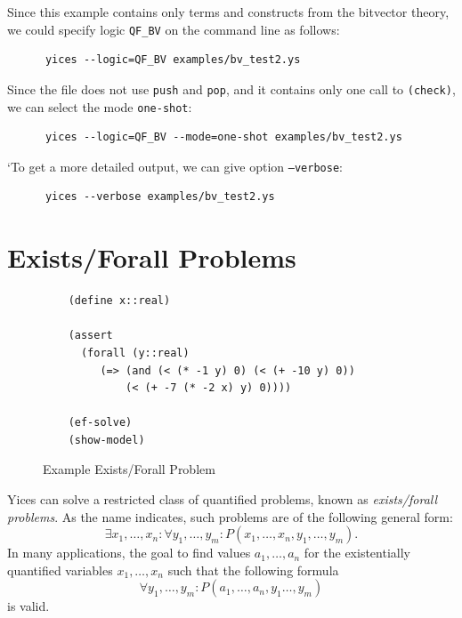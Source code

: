 \documentclass[11pt,twoside,fleqn,openright,titlepage]{cslreport}
\begin{document}
\medskip\noindent
Since  this  example  contains  only  terms and  constructs  from  the
bitvector  theory,  we  could  specify logic  \texttt{QF\_BV}  on  the
command line as follows:
\begin{small}
\begin{verbatim}
      yices --logic=QF_BV examples/bv_test2.ys
\end{verbatim}
\end{small}
Since the file does not use \texttt{push} and \texttt{pop}, and it
contains only one call to \texttt{(check)}, we can select the mode
\texttt{one-shot}:
\begin{small}
\begin{verbatim}
      yices --logic=QF_BV --mode=one-shot examples/bv_test2.ys
\end{verbatim}
\end{small}
`To get a more detailed output, we can give option \texttt{--verbose}:
\begin{small}
\begin{verbatim}
      yices --verbose examples/bv_test2.ys
\end{verbatim}
\end{small}

\section{Exists/Forall Problems}

\begin{figure}
\begin{footnotesize}
\begin{verbatim}
    (define x::real)

    (assert 
      (forall (y::real)
         (=> (and (< (* -1 y) 0) (< (+ -10 y) 0))
             (< (+ -7 (* -2 x) y) 0))))

    (ef-solve)
    (show-model)
\end{verbatim}
\end{footnotesize}
\caption{Example Exists/Forall Problem}
\label{example:ef}
\end{figure}

Yices can solve a restricted class of quantified problems, known as
\emph{exists/forall problems\/}. As the name indicates, such
problems are of the following general form:
$$\exists x_1,\ldots,x_n:\forall
y_1,\ldots,y_m: P(x_1,\ldots,x_n,y_1,\ldots,y_m).$$ In many
applications, the goal to find values $a_1,\ldots,a_n$ for the
existentially quantified variables $x_1,\ldots,x_n$ such that the
following formula $$\forall
y_1,\ldots,y_m: P(a_1,\ldots,a_n,y_1\ldots,y_m)$$ is valid.
\end{document}
